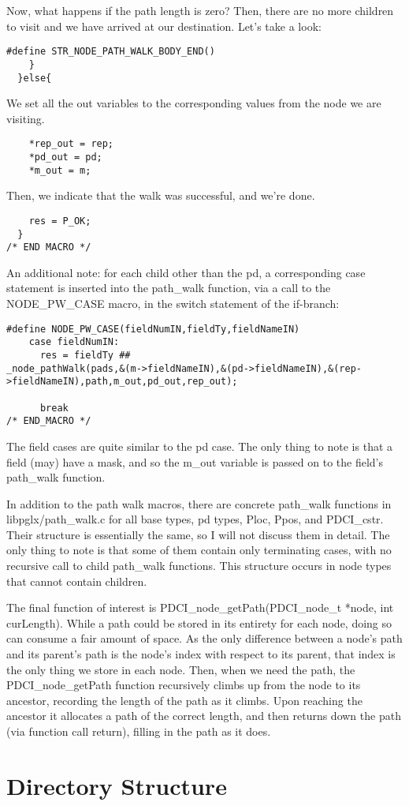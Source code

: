 \documentclass{article}
\begin{document}
Now, what happens if the path length is zero? Then, there are no more 
children to visit and we have arrived at our destination. Let's take a look:

\begin{verbatim}
#define STR_NODE_PATH_WALK_BODY_END()
    }
  }else{
\end{verbatim}

We set all the out variables to the corresponding values from the node 
we are visiting.

\begin{verbatim}
    *rep_out = rep;
    *pd_out = pd;
    *m_out = m;
\end{verbatim}

Then, we indicate that the walk was successful, and we're done.
\begin{verbatim}
    res = P_OK;
  }
/* END MACRO */
\end{verbatim}

  An additional note: for each child other than the pd, a corresponding 
case statement is inserted into the path_walk function, via a call to 
the NODE_PW_CASE macro, in the switch statement of the if-branch:

\begin{verbatim}
#define NODE_PW_CASE(fieldNumIN,fieldTy,fieldNameIN)
    case fieldNumIN:
      res = fieldTy ## 
_node_pathWalk(pads,&(m->fieldNameIN),&(pd->fieldNameIN),&(rep->fieldNameIN),path,m_out,pd_out,rep_out);      

      break
/* END_MACRO */
\end{verbatim}

The field cases are quite similar to the pd case. The only thing to note 
is that a field (may) have a mask, and so the m_out variable is passed 
on to the field's path_walk function.

  In addition to the path walk macros, there are concrete path_walk 
functions in libpglx/path_walk.c for all base types, pd types, Ploc, 
Ppos, and PDCI_cstr. Their structure is essentially the same, so I will 
not discuss them in detail. The only thing to note is that some of them 
contain only terminating cases, with no recursive call to child 
path_walk functions. This structure occurs in node types that cannot 
contain children.

  The final function of interest is PDCI_node_getPath(PDCI_node_t *node, 
int curLength). While a path could be stored in its entirety for each 
node, doing so can consume a fair amount of space. As the only 
difference between a node's path and its parent's path is the node's 
index with respect to its parent, that index is the only thing we store 
in each node. Then, when we need the path, the PDCI_node_getPath 
function recursively climbs up from the node to its ancestor, recording 
the length of the path as it climbs. Upon reaching the ancestor it 
allocates a path of the correct length, and then returns down the path 
(via function call return), filling in the path as it does.

\appendix


\section{Directory Structure}
\end{document}
